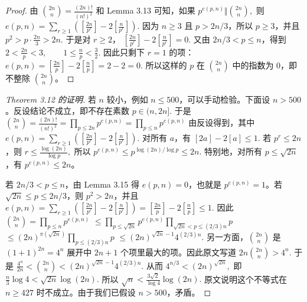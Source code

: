 \begin{proof}
	由
	\(\textstyle \binom{2n}{n}=\allowbreak{}\frac{(2n)!}{(n!)^2}\)
	和 Lemma 3.13 可知，如果
	\(\textstyle p^{e(p,\allowbreak{}n)}\Vert \binom{2n}{n},\allowbreak{}\)
	则
	\(\textstyle e(p,\allowbreak{}n)=\allowbreak{}\sum_{r\geq\allowbreak{} 1}\left(\left[\frac{2n}{p^r}\right]-2\left[\frac n{p^r}\right]\right).\)
	因为 $n\geq 3$ 且 $p>2n/3$，所以 $p\geq 3$，并且
	\(\textstyle p^2>p\cdot \frac{2n}{3}>2n.\)
	于是对 $r\geq 2$，
	\(\textstyle \left[\frac{2n}{p^r}\right]-2\left[\frac n{p^r}\right]=\allowbreak{}0.\)
	又由 $2n/3<p\leq n$，得到
	\(\textstyle 2<\frac{2n}{p}<3,\allowbreak{} \qquad 1\leq\allowbreak{} \frac np<\frac32.\)
	因此只剩下 $r=1$ 的项：
	\(\textstyle e(p,\allowbreak{}n) =\allowbreak{} \left[\frac{2n}{p}\right] - 2\left[\frac np\right] =\allowbreak{} 2-2=\allowbreak{}0.\)
	所以这样的 $p$ 在 $\binom{2n}{n}$ 中的指数为 $0$，即不整除 $\binom{2n}{n}$。
\end{proof}

\begin{proof}[Theorem 3.12 的证明]
	若 $n$ 较小，例如 $n\leq 500$，可以手动检验。下面设 $n>500$。反设结论不成立，即不存在素数
	\(\textstyle p\in(n,\allowbreak{}2n].\)
	于是
	\(\textstyle \binom{2n}{n} =\allowbreak{} \frac{(2n)!}{(n!)^2} =\allowbreak{} \prod_{p\leq\allowbreak{} 2n}p^{e(p,\allowbreak{}n)} =\allowbreak{} \prod_{p\leq\allowbreak{} n}p^{e(p,\allowbreak{}n)}\)
	由反设得到，其中
	\(\textstyle e(p,\allowbreak{}n)=\allowbreak{}\sum_{r\geq\allowbreak{} 1}\left(\left[\frac{2n}{p^r}\right]-2\left[\frac n{p^r}\right]\right).\)
	对所有 $a$，有
	\(\textstyle [2a]-2[a]\leq\allowbreak{} 1.\)
	若 $p^r\leq 2n$，则
	\(\textstyle r\leq\allowbreak{} \frac{\log(2n)}{\log p},\allowbreak{}\)
	所以
	\(\textstyle p^{e(p,\allowbreak{}n)} \leq\allowbreak{} p^{\log(2n)/\log p} \leq\allowbreak{} 2n.\)
	特别地，对所有 $p\leq \sqrt{2n}$，有 $p^{e(p,n)}\leq 2n$。

	若 $2n/3<p\leq n$，由 Lemma 3.15 得 $e(p,n)=0$，也就是 $p^{e(p,n)}=1$。若 $\sqrt{2n}\leq p\leq 2n/3$，则 $p^2>2n$，并且
	\(\textstyle e(p,\allowbreak{}n) =\allowbreak{} \sum_{r\geq\allowbreak{} 1}\left(\left[\frac{2n}{p^r}\right]-2\left[\frac n{p^r}\right]\right) =\allowbreak{} \left[\frac{2n}{p}\right]-2\left[\frac np\right] \leq\allowbreak{} 1.\)
	因此
	\(\textstyle \binom{2n}{n} =\allowbreak{} \prod_{p\leq\allowbreak{} n}p^{e(p,\allowbreak{}n)}\) \(\textstyle \leq\allowbreak{} \prod_{p\leq\allowbreak{} \sqrt{2n}}p^{e(p,\allowbreak{}n)} \prod_{\sqrt{2n}<p\leq\allowbreak{} (2/3)n}p\) \(\textstyle \leq\allowbreak{} (2n)^{\pi(\sqrt{2n})} \prod_{p\leq\allowbreak{} (2/3)n}p\) \(\textstyle \leq\allowbreak{} (2n)^{\sqrt{2n}-1}4^{(2/3)n}.\)
	另一方面，$\binom{2n}{n}$ 是
	\(\textstyle (1+\allowbreak{}1)^{2n}=\allowbreak{}4^n\)
	展开中 $2n+1$ 个项里最大的项。因此原文写道
	\(\textstyle 2n\binom{2n}{n}>4^n.\)
	于是
	\(\textstyle \frac{4^n}{2n} < \binom{2n}{n} < (2n)^{\sqrt{2n}-1}4^{(2/3)n}.\)
	从而
	\(\textstyle 4^{n/3}<(2n)^{\sqrt{2n}},\allowbreak{}\)
	即
	\(\textstyle \frac n3\log 4<\sqrt{2n}\log(2n).\)
	所以
	\(\textstyle \sqrt n<\frac{3\sqrt2}{\log 4}\log(2n).\)
	原文说明这个不等式在 $n\geq 427$ 时不成立。由于我们已假设 $n>500$，矛盾。
\end{proof}

